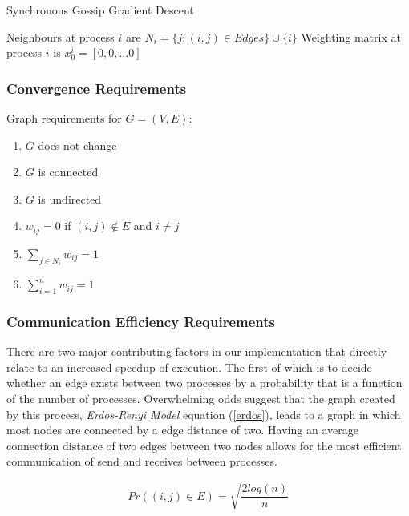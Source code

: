 \documentclass{article}
\theoremstyle{definition}
\begin{document}
{\begin{algorithm}[!ht]
    \SetAlgoLined
    \caption{Synchronous Gossip Gradient Descent}
    Neighbours at process $i$ are $N_i = \{j : (i,j)\in Edges\}\cup \{i\}$\;
    Weighting matrix at process $i$ is $x_0^i = [0, 0, ... 0]$\;
\end{algorithm}{

\subsubsection{Convergence Requirements}
Graph requirements for $G = (V, E)$:
\begin{enumerate}
    \item $G$ does not change
    \item $G$ is connected
    \item $G$ is undirected
    \item $w_{ij} = 0$ if $(i,j) \not\in E$ and $i \neq j$
    \item $\sum_{j\in N_i} w_{ij} = 1$ 
    \item $\sum_{i=1}^{n} w_{ij} = 1$
\end{enumerate}

\subsubsection{Communication Efficiency Requirements}
There are two major contributing factors in our implementation that directly relate to an increased speedup of execution. The first of which is to decide whether an edge exists between two processes by a probability that is a function of the number of processes. Overwhelming odds suggest that the graph created by this process, \textit{Erdos-Renyi Model} equation (\ref{erdos}), leads to a graph in which most nodes are connected by a edge distance of two. Having an average connection distance of two edges between two nodes allows for the most efficient communication of send and receives between processes.

\begin{equation}
    \label{erdos}
    Pr((i,j) \in E) = \sqrt{\frac{2log(n)}{n}}
\end{equation}

}}
\end{document}
